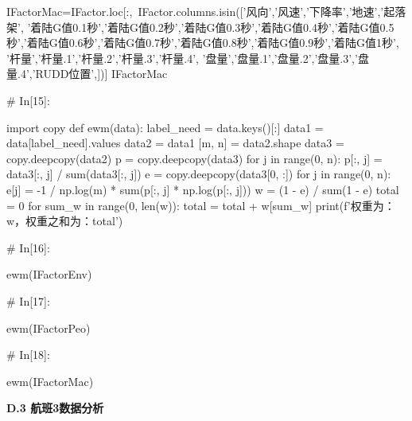 \documentclass{MathorCupModeling}
\begin{document}
\begin{python}
IFactorMac=IFactor.loc[:,~IFactor.columns.isin(['风向','风速','下降率','地速','起落架',
                          '着陆G值0.1秒','着陆G值0.2秒','着陆G值0.3秒','着陆G值0.4秒','着陆G值0.5秒','着陆G值0.6秒','着陆G值0.7秒','着陆G值0.8秒','着陆G值0.9秒','着陆G值1秒',
                          '杆量','杆量.1','杆量.2','杆量.3','杆量.4',
                          '盘量','盘量.1','盘量.2','盘量.3','盘量.4','RUDD位置',])]
IFactorMac


# In[15]:


import copy
def ewm(data):
    label_need = data.keys()[:]
    data1 = data[label_need].values
    data2 = data1
    [m, n] = data2.shape
    data3 = copy.deepcopy(data2)
    p = copy.deepcopy(data3)
    for j in range(0, n):
        p[:, j] = data3[:, j] / sum(data3[:, j])
    e = copy.deepcopy(data3[0, :])
    for j in range(0, n):
        e[j] = -1 / np.log(m) * sum(p[:, j] * np.log(p[:, j]))
    w = (1 - e) / sum(1 - e)
    total = 0
    for sum_w in range(0, len(w)):
        total = total + w[sum_w]
    print(f'权重为：{w}，权重之和为：{total}')


# In[16]:


ewm(IFactorEnv)


# In[17]:


ewm(IFactorPeo)


# In[18]:


ewm(IFactorMac)


\end{python}
\newpage
\textbf{D.3 航班3数据分析}
\end{document}
